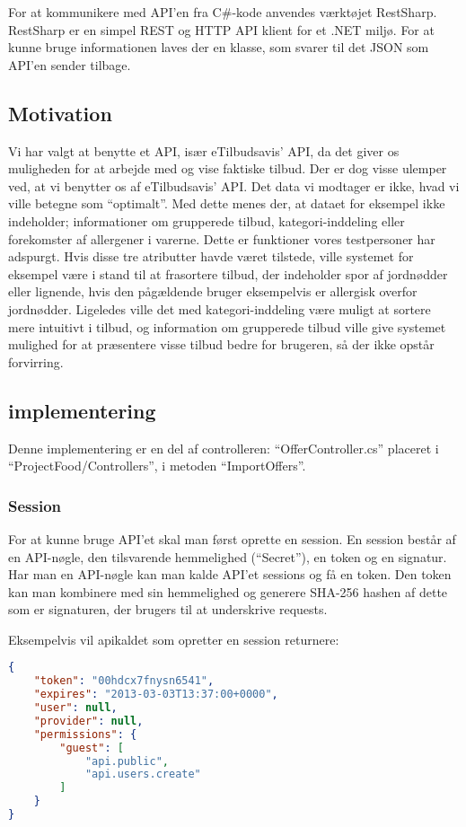 For at kommunikere med API'en fra C\#-kode anvendes værktøjet RestSharp. RestSharp er en simpel REST og HTTP API klient for et .NET miljø. \citep{RestSharp}
For at kunne bruge informationen laves der en klasse, som svarer til det JSON som API'en sender tilbage.

\subsection{Motivation}
Vi har valgt at benytte et API, især eTilbudsavis' API, da det giver os muligheden for at arbejde med og vise faktiske tilbud.
Der er dog visse ulemper ved, at vi benytter os af eTilbudsavis' API. 
Det data vi modtager er ikke, hvad vi ville betegne som ``optimalt''. 
Med dette menes der, at dataet for eksempel ikke indeholder; informationer om grupperede tilbud, kategori-inddeling eller forekomster af allergener i varerne. 
Dette er funktioner vores testpersoner har adspurgt. 
Hvis disse tre atributter havde været tilstede, ville systemet for eksempel være i stand til at frasortere tilbud, der indeholder spor af jordnødder eller lignende, hvis den pågældende bruger eksempelvis er allergisk overfor jordnødder. 
Ligeledes ville det med kategori-inddeling være muligt at sortere mere intuitivt i tilbud, og information om grupperede tilbud ville give systemet mulighed for at præsentere visse tilbud bedre for brugeren, så der ikke opstår forvirring.

\subsection{implementering}
Denne implementering er en del af controlleren: ``OfferController.cs'' placeret i ``ProjectFood/Controllers'', i metoden ``ImportOffers''.
\subsubsection{Session}
For at kunne bruge API'et skal man først oprette en session.
En session består af en API-nøgle, den tilsvarende hemmelighed (``Secret''), en token og en signatur.
Har man en API-nøgle kan man kalde API'et sessions og få en token.
Den token kan man kombinere med sin hemmelighed og generere SHA-256 hashen af dette som er signaturen, der brugers til at underskrive requests.

Eksempelvis vil apikaldet som opretter en session returnere:
\begin{lstlisting}[language=json,firstnumber=1,caption="POST til sessions api'en med APIKEYen",label=apilst1]
{
    "token": "00hdcx7fnysn6541",
    "expires": "2013-03-03T13:37:00+0000",
    "user": null,
    "provider": null,
    "permissions": {
        "guest": [
            "api.public",
            "api.users.create"
        ]
    }
}
\end{lstlisting}

